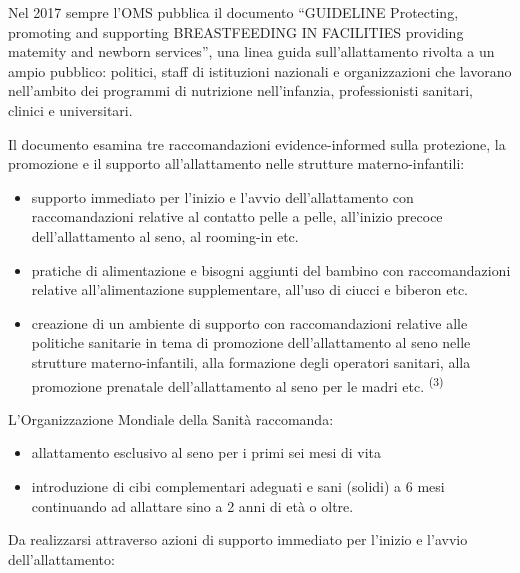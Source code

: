 \documentclass[]{article}
\begin{document}
Nel 2017 sempre l'OMS pubblica il documento ``GUIDELINE Protecting,
promoting and supporting BREASTFEEDING IN FACILITIES providing matemity
and newborn services'', una linea guida sull'allattamento rivolta a un
ampio pubblico: politici, staff di istituzioni nazionali e
organizzazioni che lavorano nell'ambito dei programmi di nutrizione
nell'infanzia, professionisti sanitari, clinici e universitari.

Il documento esamina tre raccomandazioni evidence-informed sulla
protezione, la promozione e il supporto all'allattamento nelle strutture
materno-infantili:

\begin{itemize}
\item
  supporto immediato per l'inizio e l'avvio dell'allattamento con
  raccomandazioni relative al contatto pelle a pelle, all'inizio precoce
  dell'allattamento al seno, al rooming-in etc.
\item
  pratiche di alimentazione e bisogni aggiunti del bambino con
  raccomandazioni relative all'alimentazione supplementare, all'uso di
  ciucci e biberon etc.
\item
  creazione di un ambiente di supporto con raccomandazioni relative alle
  politiche sanitarie in tema di promozione dell'allattamento al seno
  nelle strutture materno-infantili, alla formazione degli operatori
  sanitari, alla promozione prenatale dell'allattamento al seno per le
  madri etc. \textsuperscript{(3) }
\end{itemize}

L'Organizzazione Mondiale della Sanità raccomanda:

\begin{itemize}
\item
  allattamento esclusivo al seno per i primi sei mesi di vita
\item
  introduzione di cibi complementari adeguati e sani (solidi) a 6 mesi
  continuando ad allattare sino a 2 anni di età o oltre.
\end{itemize}

Da realizzarsi attraverso azioni di supporto immediato per l'inizio e
l'avvio dell'allattamento:
\end{document}
